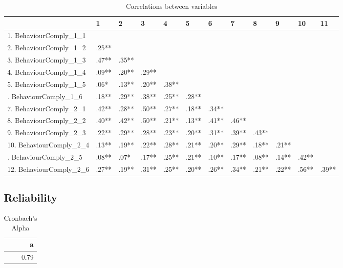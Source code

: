 \documentclass[]{article}
\begin{document}
\begin{table}[H]

\caption{\label{tab:unnamed-chunk-12}Correlations between variables}
\centering
\fontsize{6}{8}\selectfont
\begin{tabular}[t]{llllllllllll}
\toprule
  & 1 & 2 & 3 & 4 & 5 & 6 & 7 & 8 & 9 & 10 & 11\\
\midrule
1. BehaviourComply\_1\_1 &  &  &  &  &  &  &  &  &  &  & \\
2. BehaviourComply\_1\_2 & .25** &  &  &  &  &  &  &  &  &  & \\
3. BehaviourComply\_1\_3 & .47** & .35** &  &  &  &  &  &  &  &  & \\
4. BehaviourComply\_1\_4 & .09** & .20** & .29** &  &  &  &  &  &  &  & \\
5. BehaviourComply\_1\_5 & .06* & .13** & .20** & .38** &  &  &  &  &  &  & \\
\addlinespace
6. BehaviourComply\_1\_6 & .18** & .29** & .38** & .25** & .28** &  &  &  &  &  & \\
7. BehaviourComply\_2\_1 & .42** & .28** & .50** & .27** & .18** & .34** &  &  &  &  & \\
8. BehaviourComply\_2\_2 & .40** & .42** & .50** & .21** & .13** & .41** & .46** &  &  &  & \\
9. BehaviourComply\_2\_3 & .22** & .29** & .28** & .23** & .20** & .31** & .39** & .43** &  &  & \\
10. BehaviourComply\_2\_4 & .13** & .19** & .22** & .28** & .21** & .20** & .29** & .18** & .21** &  & \\
\addlinespace
11. BehaviourComply\_2\_5 & .08** & .07* & .17** & .25** & .21** & .10** & .17** & .08** & .14** & .42** & \\
12. BehaviourComply\_2\_6 & .27** & .19** & .31** & .25** & .20** & .26** & .34** & .21** & .22** & .56** & .39**\\
\bottomrule
\end{tabular}
\end{table}

\hypertarget{reliability-1}{%
\subsection{Reliability}\label{reliability-1}}

\begin{table}[H]

\caption{\label{tab:unnamed-chunk-13}Cronbach's Alpha}
\centering
\fontsize{6}{8}\selectfont
\begin{tabular}[t]{r}
\toprule
a\\
\midrule
0.79\\
\bottomrule
\end{tabular}
\end{table}
\end{document}
